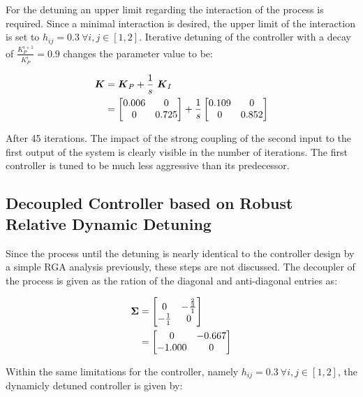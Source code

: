  For the detuning an upper limit regarding the interaction of the process is required. Since a minimal interaction is desired, the upper limit of the interaction is set to $h_{ij} = 0.3 ~ \forall i,j \in [1,2]$. Iterative detuning of the controller with a decay of $\frac{K_P^{i+1}}{K_P^{i}} = 0.9 $ changes the parameter value to be:

\begin{align}
\mbox{\boldmath$K$} &= \mbox{\boldmath$K$}_P + \frac{1}{s}~ \mbox{\boldmath$K$}_I\\
&= \begin{bmatrix}
0.006 & 0 \\
0 & 0.725
\end{bmatrix}
+ \frac{1}{s}\begin{bmatrix}
0.109 & 0 \\
0 & 0.852
\end{bmatrix}
\end{align}

After 45 iterations. The impact of the strong coupling of the second input to the first output of the system is clearly visible in the number of iterations. The first controller is tuned to be much less aggressive than its predecessor.



\subsection{Decoupled Controller based on Robust Relative Dynamic Detuning}
\label{c:fotd:s:rosenbrock:ss:modifiedastr}

Since the process until the detuning is nearly identical to the controller design by a simple RGA analysis previously, these steps are not discussed. The decoupler of the process is given as the ration of the diagonal and anti-diagonal entries as:

\begin{align*}
\begin{split}
\mbox{\boldmath$\Sigma$} &= \begin{bmatrix}
0 & -\frac{\frac{2}{3}}{1} \\
-\frac{1}{1} & 0
\end{bmatrix}
\\
&= \begin{bmatrix}
0 & -0.667 \\
-1.000 & 0
\end{bmatrix}
\end{split}
\end{align*}

Within the same limitations for the controller, namely $h_{ij} = 0.3 ~ \forall i,j \in [1,2]$, the dynamicly detuned controller is given by:


